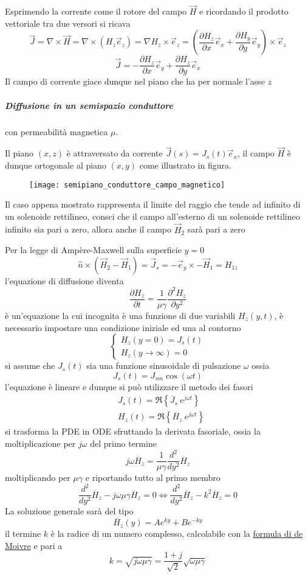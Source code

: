 Esprimendo la corrente come il rotore del campo $\vec{H}$ e ricordando il prodotto vettoriale tra due
versori si ricava
$$
\vec{J} = \nabla\times\vec{H} = \nabla\times\left(H_z\vec{e}_z\right) = \nabla H_z \times\vec{e}_z = \left(\frac{\partial H_z}{\partial x}\vec{e}_x + \frac{\partial H_y}{\partial y}\vec{e}_y\right) \times \vec{e}_z
$$
$$
\vec{J} = - \frac{\partial H_z}{\partial x}\vec{e}_y + \frac{\partial H_z}{\partial y}\vec{e}_x 
$$
Il campo di corrente giace dunque nel piano che ha per normale l'asse $z$
\newpage
\subparagraph{Diffusione in un semispazio conduttore} con permeabilità magnetica $\mu$.

Il piano $(x,z)$ è attraversato da corrente $\vec{J}(s) = J_s(t)\vec{e}_x$, il campo $\vec{H}$ è dunque ortogonale al piano $(x,y)$
come illustrato in figura.
\begin{figure}[H]
\centering
\texttt{[image: semipiano\_conduttore\_campo\_magnetico]}
\end{figure}

Il caso appena mostrato rappresenta il limite del raggio che tende ad infinito di un solenoide rettilineo,
consci che il campo all'esterno di un solenoide rettilineo infinito sia pari a zero, allora
anche il campo $\vec{H}_2$ sarà pari a zero 

Per la legge di Ampère-Maxwell sulla superficie $y=0$ 
$$
\hat{n}\times\left(\vec{H}_2-\vec{H}_1\right) = \vec{J}_s = -\vec{e}_y \times -\vec{H}_1 = H_{1z}
$$
l'equazione di diffusione diventa
$$
\frac{\partial H_z}{\partial t} = \frac{1}{\mu\gamma} \frac{\partial^2 H_z}{\partial y^2}
$$
è un'equazione la cui incognita è una funzione di due variabili $H_z(y,t)$, è necessario impostare una 
condizione iniziale ed una al contorno
$$
\begin{cases}
H_z(y=0) = J_s(t)\\
H_z(y\to \infty) = 0
\end{cases}
$$
si assume che $J_s(t)$ sia una funzione sinusoidale di pulsazione $\omega$ ossia
$$
J_s(t) = J_{sm} \cos\left(\omega t\right)
$$
l'equazione è lineare e dunque si può utilizzare il metodo dei fasori
$$
\begin{aligned}
&J_s(t) = \Re \left\{\overline{J}_s\ e^{j\omega t} \right\} \\
&H_z(t) = \Re \left\{ \overline{H}_z\ e^{j\omega t} \right\}
\end{aligned}
$$
si trasforma la PDE in ODE sfruttando la derivata fasoriale, ossia la moltiplicazione per $j\omega$
del primo termine
$$
j\omega \overline{H}_z = \frac{1}{\mu\gamma} \frac{d^2}{dy^2}\overline{H}_z
$$
moltiplicando per $\mu\gamma$ e riportando tutto al primo membro
$$
\frac{d^2}{dy^2}\overline{H}_z - j\omega\mu\gamma\overline{H}_z = 0 \Leftrightarrow 
\frac{d^2}{dy^2}\overline{H}_z - k^2 \overline{H}_z = 0
$$
La soluzione generale sarà del tipo
$$
\overline{H}_z(y) = Ae^{ky} + Be^{-ky}
$$
il termine $k$ è la radice di un numero complesso, calcolabile con la \href{https://www.youmath.it/lezioni/analisi-matematica/numeri-complessi/760-calcolare-le-radici-di-un-numero-complesso.html}{formula di de Moivre} e pari
a
$$
k = \sqrt{j\omega\mu\gamma} = \frac{1+j}{\sqrt{2}}\sqrt{\omega\mu\gamma}
$$

